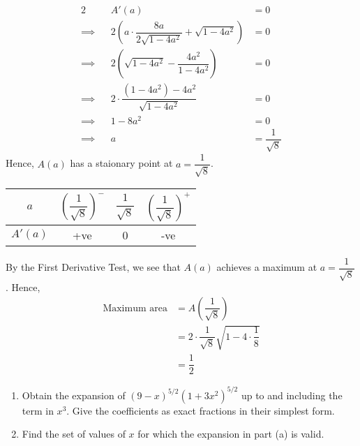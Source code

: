 \documentclass{echw}
\begin{document}
        \begin{alignat*}{2}
            &&A'(a) &= 0\\
            \implies&&2\left(a \cdot \dfrac{8a}{2\sqrt{1-4a^2}} + \sqrt{1 - 4a^2}\right) &= 0\\
            \implies&&2\left(\sqrt{1 - 4a^2} - \dfrac{4a^2}{1-4a^2}\right) &= 0\\
            \implies&&2 \cdot \dfrac{\left(1-4a^2\right) - 4a^2}{\sqrt{1-4a^2}} &= 0\\
            \implies&&1 - 8a^2 &= 0\\
            \implies&&a &= \dfrac1{\sqrt8}
        \end{alignat*}
        Hence, $A(a)$ has a staionary point at $a = \dfrac1{\sqrt8}$.
        \begin{table}[H]
            \centering
            \begin{tabular}{|c|c|c|c|}
            \hline
            $a$ & $\left(\dfrac1{\sqrt8}\right)^-$ & $\dfrac1{\sqrt8}$ & $\left(\dfrac1{\sqrt8}\right)^+$ \\\hline
            $A'(a)$ & +ve   & 0 & -ve   \\\hline
            \end{tabular}
        \end{table}
        \noindent By the First Derivative Test, we see that $A(a)$ achieves a maximum at $a = \dfrac1{\sqrt8}$. Hence,
        \begin{align*}
            \text{Maximum area} &= A\left(\dfrac1{\sqrt8}\right)\\
            &= 2\cdot\dfrac1{\sqrt8}\sqrt{1 - 4\cdot\dfrac18}\\
            &= \dfrac12 
        \end{align*}


    \problem{}
        \begin{enumerate}
            \item Obtain the expansion of $(9 - x)^{5/2}\left(1 + 3x^2\right)^{5/2}$ up to and including the term in $x^3$. Give the coefficients as exact fractions in their simplest form.
            \item Find the set of values of $x$ for which the expansion in part (a) is valid.
        \end{enumerate}

    \solution
\end{document}
